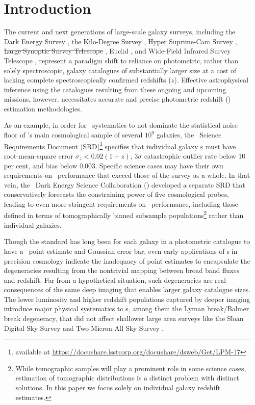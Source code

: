 \section{Introduction}
\label{sec:intro}

The current and next generations of large-scale galaxy surveys, including the Dark Energy Survey \citep[,][]{Abbott:05}, the Kilo-Degree Survey \citep[,][]{de_Jong:13}, Hyper Suprime-Cam Survey \citep[,][]{Aihara:2018a,Aihara:2018b}, \sout{Large Synoptic Survey Telescope}  \citep[\lsst,][]{Abell:09}, Euclid \citep{Laureijs:11}, and Wide-Field Infrared Survey Telescope \citep[,][]{Green:12}, represent a paradigm shift to reliance on photometric, rather than solely spectroscopic, galaxy catalogues of substantially larger size at a cost of lacking complete spectroscopically confirmed redshifts ($z$).
Effective astrophysical inference using the catalogues resulting from these ongoing and upcoming missions, however, necessitates accurate and precise photometric redshift (\pz) estimation methodologies.

As an example, in order for \pz\ systematics to not dominate the statistical noise floor of \lsst's main cosmological sample of several $10^{9}$ galaxies, the \lsst\ Science Requirements Document (SRD)\footnote{available at \url{https://docushare.lsstcorp.org/docushare/dsweb/Get/LPM-17}} specifies that individual galaxy \pz s must have root-mean-square error $\sigma_z < 0.02 (1+z)$, $3 \sigma$ catastrophic outlier rate below $10$ per cent, and bias below $0.003$.
Specific science cases may have their own requirements on \pz\ performance that exceed those of the survey as a whole.
In that vein, the \lsst\ Dark Energy Science Collaboration (\lsstdesc) developed a separate SRD \citep{Mandelbaum:2018} that conservatively forecasts the constraining power of five cosmological probes, leading to even more stringent requirements on \pz\ performance, including those defined in terms of tomographically binned subsample populations\footnote{While tomographic samples will play a prominent role in some science cases, estimation of tomographic distributions is a distinct problem with distinct solutions. In this paper we focus solely on individual galaxy redshift estimates.} rather than individual galaxies.

Though the standard has long been for each galaxy in a photometric catalogue to have a \pz\ point estimate and Gaussian error bar, even early applications of \pz s in precision cosmology indicate the inadequacy of point estimates \citep{mandelbaum:2008} to encapsulate the degeneracies resulting from the nontrivial mapping between broad band fluxes and redshift.
Far from a hypothetical situation, such degeneracies are real consequences of the same deep imaging that enables larger galaxy catalogue sizes.
The lower luminosity and higher redshift populations captured by deeper imaging introduce major physical systematics to \pz s, among them the Lyman break/Balmer break degeneracy, that did not affect shallower large area surveys like the Sloan Digital Sky Survey \citep[\textsc{SDSS},][]{York:00} and Two Micron All Sky Survey \citep[\textsc{2MASS},][]{Skrutskie:06}.

